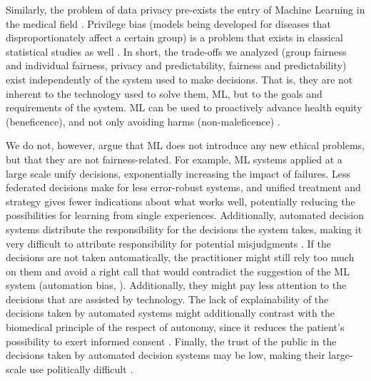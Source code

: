 Similarly, the problem of data privacy pre-exists the entry of Machine Learning in the medical field \cite[p.~346]{Dijkstra2020}.
Privilege bias (models being developed for diseases that disproportionately affect a certain group) \cite[p.~5]{Rajkomar2018} is a problem that exists in classical statistical studies as well \cite{Jackson2019}.
In short, the trade-offs we analyzed (group fairness and individual fairness, privacy and predictability, fairness and predictability) exist independently of the system used to make decisions.
That is, they are not inherent to the technology used to solve them, ML, but to the goals and requirements of the system.
ML can be used to proactively advance health equity (beneficence), and not only avoiding harms (non-maleficence) \cite[p.~2]{Rajkomar2018}.

We do not, however, argue that ML does not introduce any new ethical problems, but that they are not fairness-related.
For example, ML systems applied at a large scale unify decisions, exponentially increasing the impact of failures.
Less federated decisions make for less error-robust systems, and unified treatment and strategy gives fewer indications about what works well, potentially reducing the possibilities for learning from single experiences.
Additionally, automated decision systems distribute the responsibility for the decisions the system takes, making it very difficult to attribute responsibility for potential misjudgments \cite[p.~6]{Morley2020}.
If the decisions are not taken automatically, the practitioner might still rely too much on them and avoid a right call that would contradict the suggestion of the ML system \cite[p.~4]{Morley2020} (automation bias, \cite[p.~4]{Rajkomar2018}).
Additionally, they might pay less attention to the decisions that are assisted by technology.
The lack of explainability of the decisions taken by automated systems might additionally contrast with the biomedical principle of the respect of autonomy, since it reduces the patient's possibility to exert informed consent \cite[p.~346]{Dijkstra2020}.
Finally, the trust of the public in the decisions taken by automated decision systems may be low, making their large-scale use politically difficult \cite[p.~4]{Morley2020}.


